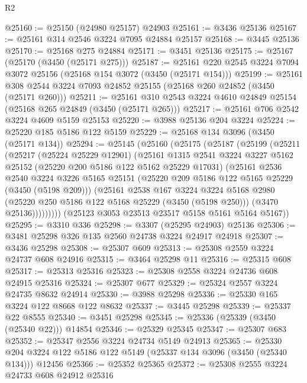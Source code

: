 \begin{lexlean}{R2}
\begin{coremodule}
@25160 := @25150 (@24980 @25157) @24903
@25161 := @3436 @25136
@25167 := @25161 @314 @2546 @3224 @7095 @24884 @25157
@25168 := @3445 @25136
@25170 := @25168 @275 @24884
@25171 := @3451 @25136
@25175 := @25167 (@25170 (@3450 (@25171 @275)))
@25187 := @25161 @220 @2545 @3224 @7094 @3072 @25156 (@25168 @154 @3072 (@3450 (@25171 @154)))
@25199 := @25161 @308 @2544 @3224 @7093 @24852 @25155 (@25168 @260 @24852 (@3450 (@25171 @260)))
@25211 := @25161 @310 @2543 @3224 @4610 @24849 @25154 (@25168 @265 @24849 (@3450 (@25171 @265)))
@25217 := @25161 @706 @2542 @3224 @4609 @5159 @25153
@25220 := @3988 @25136 @204 @3224
@25224 := @25220 @185 @5186 @122 @5159
@25229 := @25168 @134 @3096 (@3450 (@25171 @134))
@25294 := @25145
    (@25160
      (@25175
        (@25187
          (@25199
            (@25211
              (@25217
                (@25224 @25229 @12901)
                (@25161
                  @1315
                  @2541
                  @3224
                  @3227
                  @5162
                  @25152
                  (@25220 @200 @5186 @122 @5162 @25229 @17031)
                  (@25161
                    @2536
                    @2540
                    @3224
                    @3226
                    @5165
                    @25151
                    (@25220 @209 @5186 @122 @5165 @25229 (@3450 (@5198 @209)))
                    (@25161
                      @2538
                      @167
                      @3224
                      @3224
                      @5168
                      @2980
                      (@25220 @250 @5186 @122 @5168 @25229 (@3450 (@5198 @250)))
                      (@3470 @25136)))))))))
      (@25123 @3053 @23513 @23517 @5158 @5161 @5164 @5167))
@25295 := @3310 @336
@25298 := @3307 (@25295 @24903) @25136
@25306 := @3481 @25298 @326 @135 @2560 @24738 @3224 @24917 @24918
@25307 := @3436 @25298
@25308 := @25307 @609
@25313 := @25308 @2559 @3224 @24737 @608 @24916
@25315 := @3464 @25298 @11
@25316 := @25315 @608
@25317 := @25313 @25316
@25323 := @25308 @2558 @3224 @24736 @608 @24915 @25316
@25324 := @25307 @677
@25329 := @25324 @2557 @3224 @24735 @8632 @24914
@25330 := @3988 @25298
@25336 := @25330 @165 @3224 @122 @8668 @122 @8632
@25337 := @3445 @25298
@25339 := @25337 @22 @8555
@25340 := @3451 @25298
@25345 := @25336 (@25339 (@3450 (@25340 @22))) @14854
@25346 := @25329 @25345
@25347 := @25307 @683
@25352 := @25347 @2556 @3224 @24734 @5149 @24913
@25365 := @25330 @204 @3224 @122 @5186 @122 @5149 (@25337 @134 @3096 (@3450 (@25340 @134))) @12456
@25366 := @25352 @25365
@25372 := @25308 @2555 @3224 @24733 @608 @24912 @25316

\end{coremodule}
\end{lexlean}

